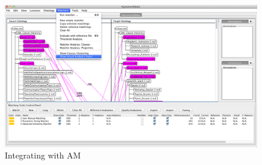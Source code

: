 \begin{figure}[htb]
	\centering
	\includegraphics[width=6.5in]{pics/Integrate.png}
	\caption{Integrating with AM}
	\label{fig:integrating}
\end{figure}